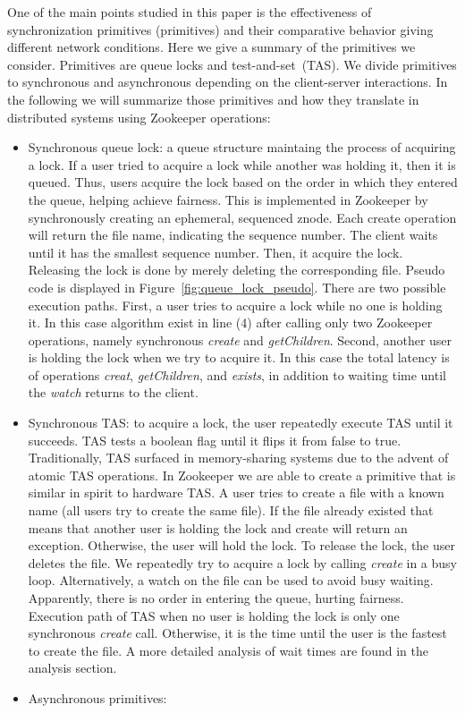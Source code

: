 One of the main points studied in this paper is the effectiveness of synchronization primitives (primitives) and their comparative behavior giving different network conditions. Here we give a summary of the primitives we consider. Primitives are queue locks and test-and-set~(TAS). We divide primitives to synchronous and asynchronous depending on the client-server interactions. In the following we will summarize those primitives and how they translate in distributed systems using Zookeeper operations:
\begin{itemize}
\item{Synchronous queue lock: a queue structure maintaing the process of acquiring a lock. If a user tried to acquire a lock while another was holding it, then it is queued. Thus, users acquire the lock based on the order in which they entered the queue, helping achieve fairness. This is implemented in Zookeeper by synchronously creating an ephemeral, sequenced znode. Each create operation will return the file name, indicating the sequence number. The client waits until it has the smallest sequence number. Then, it acquire the lock. Releasing the lock is done by merely deleting the corresponding file. Pseudo code is displayed in Figure~\ref{fig:queue_lock_pseudo}. There are two possible execution paths. First, a user tries to acquire a lock while no one is holding it. In this case algorithm exist in line (4) after calling only two Zookeeper operations, namely synchronous \emph{create} and \emph{getChildren}. Second, another user is holding the lock when we try to acquire it. In this case the total latency is of operations \emph{creat}, \emph{getChildren}, and \emph{exists}, in addition to waiting time until the \emph{watch} returns to the client.}
\item{Synchronous TAS: to acquire a lock, the user repeatedly execute TAS until it succeeds. TAS tests a boolean flag until it flips it from false to true. Traditionally, TAS surfaced in memory-sharing systems due to the advent of atomic TAS operations. In Zookeeper we are able to create a primitive that is similar in spirit to hardware TAS. A user tries to create a file with a known name (all users try to create the same file). If the file already existed that means that another user is holding the lock and create will return an exception. Otherwise, the user will hold the lock. To release the lock, the user deletes the file. We repeatedly try to acquire a lock by calling \emph{create} in a busy loop. Alternatively, a watch on the file can be used to avoid busy waiting. Apparently, there is no order in entering the queue, hurting fairness. Execution path of TAS when no user is holding the lock is only one synchronous \emph{create} call. Otherwise, it is the time until the user is the fastest to create the file. A more detailed analysis of wait times are found in the analysis section. }
\item{Asynchronous primitives: }
\end{itemize}



